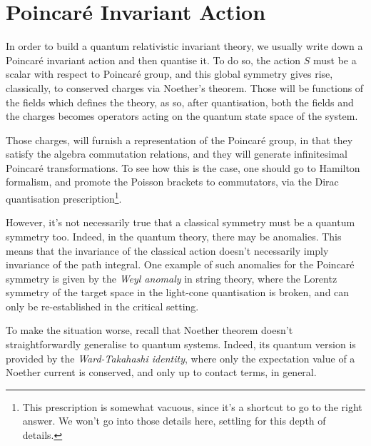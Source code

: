 \begin{comment}
\begin{namedtheorem}[Gauss]
Let $\V$ denote a finite region of the spacetime manifold, bounded by a closed hypersurface $\de \V$. For any vector field $A^\alpha$ defined within $\V$,
    \begin{equation}\label{eq:gauss-theorem}
        \int_\V \cov_\alpha A^\alpha \sg \, \udq x = \oint_{\de \V} A^\alpha \ud \Sigma_\alpha ,
    \end{equation}
where $\ud \Sigma_\alpha$ is the surface element defined by~\eqref{eq:directed-surface-element}.
\end{namedtheorem}
\end{comment}

\section{Poincaré Invariant Action}
In order to build a quantum relativistic invariant theory, we usually write down a Poincaré invariant action and then quantise it. To do so, the action $S$ must be a scalar with respect to Poincaré group, and this global symmetry gives rise, classically, to conserved charges via Noether's theorem. Those will be functions of the fields which defines the theory, as so, after quantisation, both the fields and the charges becomes operators acting on the quantum state space of the system.

Those charges, will furnish a representation of the Poincaré group, in that they satisfy the algebra commutation relations, and they will generate infinitesimal Poincaré transformations. To see how this is the case, one should go to Hamilton formalism, and promote the Poisson brackets to commutators, via the Dirac quantisation prescription\footnote{This prescription is somewhat vacuous, since it's a shortcut to go to the right answer. We won't go into those details here, settling for this depth of details.}. 

However, it's not necessarily true that a classical symmetry must be a quantum symmetry too. Indeed, in the quantum theory, there may be anomalies. This means that the invariance of the classical action doesn't necessarily imply invariance of the path integral. One example of such anomalies for the Poincaré symmetry is given by the \emph{Weyl anomaly} in string theory, where the Lorentz symmetry of the target space in the light-cone quantisation is broken, and can only be re-established in the critical setting.

To make the situation worse, recall that Noether theorem doesn't straightforwardly generalise to quantum systems. Indeed, its quantum version is provided by the \emph{Ward-Takahashi identity}, where only the expectation value of a Noether current is conserved, and only up to contact terms, in general.

